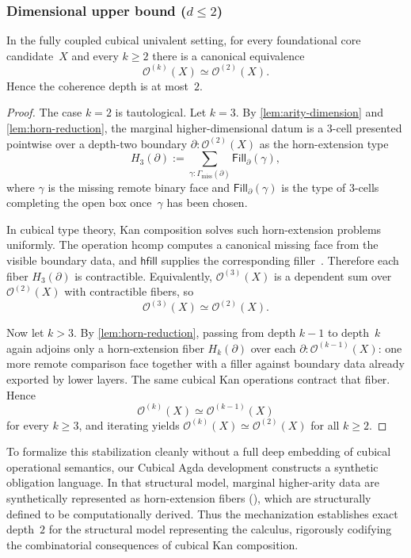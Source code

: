 \documentclass{lmcs}
\newcommand{\Ocal}{\mathcal{O}}
\newcommand{\hcomp}{\mathrm{hcomp}}
\begin{document}
\subsubsection{\texorpdfstring{Dimensional upper bound ($d \leq 2$)}{Dimensional upper bound}}

\begin{thm}
\label{thm:upper}
In the fully coupled cubical univalent setting, for every foundational core candidate~$X$ and every $k \geq 2$ there is a canonical equivalence
\[
  \Ocal^{(k)}(X) \simeq \Ocal^{(2)}(X).
\]
Hence the coherence depth is at most~$2$.
\end{thm}

\begin{proof}
The case $k=2$ is tautological. Let $k=3$. By \autoref{lem:arity-dimension} and \autoref{lem:horn-reduction}, the marginal higher-dimensional datum is a $3$-cell presented pointwise over a depth-two boundary $\partial : \Ocal^{(2)}(X)$ as the horn-extension type
\[
  H_3(\partial)
  :=
  \sum_{\gamma : \Gamma_{\mathrm{miss}}(\partial)}
  \mathsf{Fill}_{\partial}(\gamma),
\]
where $\gamma$ is the missing remote binary face and $\mathsf{Fill}_{\partial}(\gamma)$ is the type of $3$-cells completing the open box once~$\gamma$ has been chosen.

In cubical type theory, Kan composition solves such horn-extension problems uniformly. The operation $\hcomp$ computes a canonical missing face from the visible boundary data, and $\mathsf{hfill}$ supplies the corresponding filler~\cite{cubical,cchm-hits}. Therefore each fiber $H_3(\partial)$ is contractible. Equivalently, $\Ocal^{(3)}(X)$ is a dependent sum over $\Ocal^{(2)}(X)$ with contractible fibers, so
\[
  \Ocal^{(3)}(X) \simeq \Ocal^{(2)}(X).
\]

Now let $k>3$. By \autoref{lem:horn-reduction}, passing from depth $k-1$ to depth~$k$ again adjoins only a horn-extension fiber $H_k(\partial)$ over each $\partial : \Ocal^{(k-1)}(X)$: one more remote comparison face together with a filler against boundary data already exported by lower layers. The same cubical Kan operations contract that fiber. Hence
\[
  \Ocal^{(k)}(X) \simeq \Ocal^{(k-1)}(X)
\]
for every $k \geq 3$, and iterating yields $\Ocal^{(k)}(X) \simeq \Ocal^{(2)}(X)$ for all $k \geq 2$.
\end{proof}

\begin{rem}
\label{rem:structural-model-upper}
To formalize this stabilization cleanly without a full deep embedding of cubical operational semantics, our Cubical Agda development constructs a synthetic obligation language. In that structural model, marginal higher-arity data are synthetically represented as horn-extension fibers (), which are structurally defined to be computationally derived. Thus the mechanization establishes exact depth~$2$ for the structural model representing the calculus, rigorously codifying the combinatorial consequences of cubical Kan composition.
\end{rem}
\end{document}
